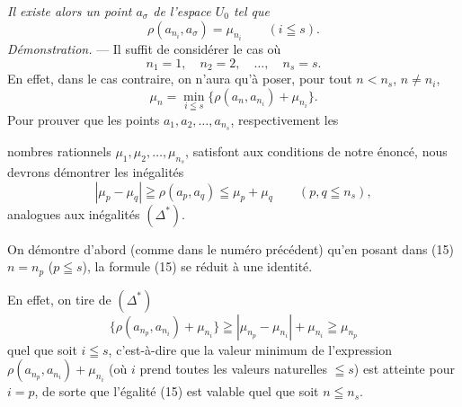 \documentclass[a4paper,12pt]{amsart}
\newcommand{\srcpage}[1]{} %
\begin{document}
\textit{Il existe alors un point $a_\sigma$ de l'espace $U_0$ tel que}
\[
\rho(a_{n_i},a_\sigma)=\mu_{n_i}\qquad(i\leqq s).
\]
\textit{Démonstration.} --- Il suffit de considérer le cas où
\begin{equation}\tag{14}
n_1=1,\quad n_2=2,\quad\dots,\quad n_s=s.
\end{equation}
En effet, dans le cas contraire, on n'aura qu'à poser, pour tout $n<n_s$, $n\ne n_i$,
\begin{equation}\tag{15}
\mu_n=\min_{i\leqq s}\{\rho(a_n,a_{n_i})+\mu_{n_i}\}.
\end{equation}
Pour prouver que les points $a_1,a_2,\dots,a_{n_s}$, respectivement les
\srcpage{57}
nombres rationnels $\mu_1,\mu_2,\dots,\mu_{n_s}$, satisfont aux conditions de notre énoncé, nous devrons démontrer les inégalités
\begin{equation}\tag{$\Delta^*$ bis}
|\mu_p-\mu_q|\geqq\rho(a_p,a_q)\leqq\mu_p+\mu_q\qquad(p,q\leqq n_s),
\end{equation}
analogues aux inégalités $(\Delta^*)$.

On démontre d'abord (comme dans le numéro précédent) qu'en posant dans (15) $n=n_p$ ($p\leqq s$), la formule (15) se réduit à une identité.

En effet, on tire de $(\Delta^*)$
\[
\{\rho(a_{n_p},a_{n_i})+\mu_{n_i}\}\geqq|\mu_{n_p}-\mu_{n_i}|+\mu_{n_i}\geqq\mu_{n_p}
\]
quel que soit $i\leqq s$, c'est-à-dire que la valeur minimum de l'expression $\rho(a_{n_p},a_{n_i})+\mu_{n_i}$ (où $i$ prend toutes les valeurs naturelles $\leqq s$) est atteinte pour $i=p$, de sorte que l'égalité (15) est valable quel que soit $n\leqq n_s$.
\end{document}
